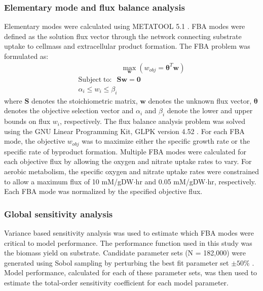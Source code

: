 \documentclass[10pt,twocolumn,twoside,final]{IEEEtran}
\begin{document}
\noindent\subsubsection*{Elementary mode and flux balance analysis}
Elementary modes were calculated using METATOOL 5.1 \cite{2006_vonKamp_Metatool}.
FBA modes were defined as the solution flux vector through the network connecting substrate uptake to cellmass and extracellular product formation.
The FBA problem was formulated as:
\begin{equation}
 \begin{multlined}
	\qquad \qquad \qquad \max_{\boldsymbol{w}}{} \! \left( w_{obj} = \mathbf{\boldsymbol{\theta}}^T \boldsymbol{w} \right) \\
	\mathrm{Subject \; to:}
	 \; \; \mathbf{S}\mathbf{w}=\mathbf{0} \\
\alpha_i \leq w_i \leq \beta_i  \qquad
 \end{multlined}
\end{equation}
where $\mathbf{S}$ denotes the stoichiometric matrix, $\mathbf{w}$ denotes the unknown flux vector, $\boldsymbol{\theta}$ denotes the objective selection vector
and $\alpha_i$ and $\beta_i$ denote the lower and upper bounds on flux $w_{i}$, respectively.
The flux balance analysis problem was solved using the GNU Linear Programming Kit, GLPK version 4.52 \cite{GLPK}.
For each FBA mode, the objective $w_{obj}$ was to maximize either the specific growth rate or the specific rate of byproduct formation.
Multiple FBA modes were calculated for each objective flux by allowing the oxygen and nitrate uptake rates to vary.
For aerobic metabolism, the specific oxygen and nitrate uptake rates were constrained to allow a maximum flux of 10 mM/gDW$\cdot$hr and 0.05 mM/gDW$\cdot$hr, respectively.
Each FBA mode was normalized by the specified objective flux.

\subsubsection*{Global sensitivity analysis}
Variance based sensitivity analysis was used to estimate which FBA modes were critical to model performance.
The performance function used in this study was the biomass yield on substrate.
Candidate parameter sets (N = 182,000) were generated using Sobol sampling by perturbing the best fit parameter set $\pm50\%$ \cite{SALib}.
Model performance, calculated for each of these parameter sets, was then used to estimate the total-order sensitivity coefficient for each model parameter.
\end{document}

